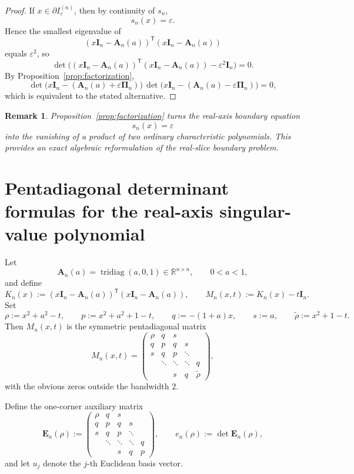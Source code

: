 \documentclass[11pt]{article}
\numberwithin{equation}{section}
\newtheorem{remark}[theorem]{Remark}
\newcommand{\R}{\mathbb R}
\newcommand{\A}{\mathbf A}
\newcommand{\I}{\mathbf I}
\newcommand{\PiM}{\mathbf \Pi}
\newcommand{\tridiag}{\operatorname{tridiag}}
\begin{document}
\begin{proof}
If \(x\in\partial I_\varepsilon^{(n)}\), then by continuity of \(s_n\),
\[
s_n(x)=\varepsilon.
\]
Hence the smallest eigenvalue of
\[
(x\I_n-\A_n(a))^{\mathsf T}(x\I_n-\A_n(a))
\]
equals \(\varepsilon^2\), so
\[
\det\!\bigl((x\I_n-\A_n(a))^{\mathsf T}(x\I_n-\A_n(a))-\varepsilon^2\I_n\bigr)=0.
\]
By Proposition~\ref{prop:factorization},
\[
\det\!\bigl(x\I_n-(\A_n(a)+\varepsilon\PiM_n)\bigr)\,
\det\!\bigl(x\I_n-(\A_n(a)-\varepsilon\PiM_n)\bigr)=0,
\]
which is equivalent to the stated alternative.
\end{proof}

\begin{remark}
Proposition~\ref{prop:factorization} turns the real-axis boundary equation
\[
s_n(x)=\varepsilon
\]
into the vanishing of a product of two ordinary characteristic polynomials.  This
provides an exact algebraic reformulation of the real-slice boundary problem.
\end{remark}

\section{Pentadiagonal determinant formulas for the real-axis singular-value polynomial}
\label{app:pentadiagonal}

Let
\[
\A_n(a)=\tridiag(a,0,1)\in \R^{n\times n},
\qquad 0<a<1,
\]
and define
\[
K_n(x):=(x\I_n-\A_n(a))^{\mathsf T}(x\I_n-\A_n(a)),
\qquad
M_n(x,t):=K_n(x)-t\I_n.
\]
Set
\[
\rho:=x^2+a^2-t,\qquad
p:=x^2+a^2+1-t,\qquad
q:=-(1+a)x,\qquad
s:=a,\qquad
\widetilde\rho:=x^2+1-t.
\]
Then \(M_n(x,t)\) is the symmetric pentadiagonal matrix
\[
M_n(x,t)=
\begin{pmatrix}
\rho & q & s \\
q & p & q & s \\
s & q & p & \ddots \\
& \ddots & \ddots & \ddots & q \\
& & s & q & \widetilde\rho
\end{pmatrix},
\]
with the obvious zeros outside the bandwidth \(2\).

Define the one-corner auxiliary matrix
\[
\mathbf E_n(\rho):=
\begin{pmatrix}
\rho & q & s \\
q & p & q & s \\
s & q & p & \ddots \\
& \ddots & \ddots & \ddots & q \\
& & s & q & p
\end{pmatrix},
\qquad
e_n(\rho):=\det \mathbf E_n(\rho),
\]
and let \(u_j\) denote the \(j\)-th Euclidean basis vector.
\end{document}
